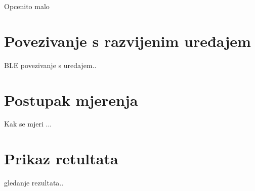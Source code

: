 \documentclass[../diplomski_rad.tex]{subfiles}
\begin{document}
\sloppy

\justifying

Opcenito malo 

\section{Povezivanje s razvijenim uređajem}

BLE povezivanje s uredajem..

\section{Postupak mjerenja}

Kak se mjeri ...

\section{Prikaz retultata}

gledanje rezultata..
\end{document}
